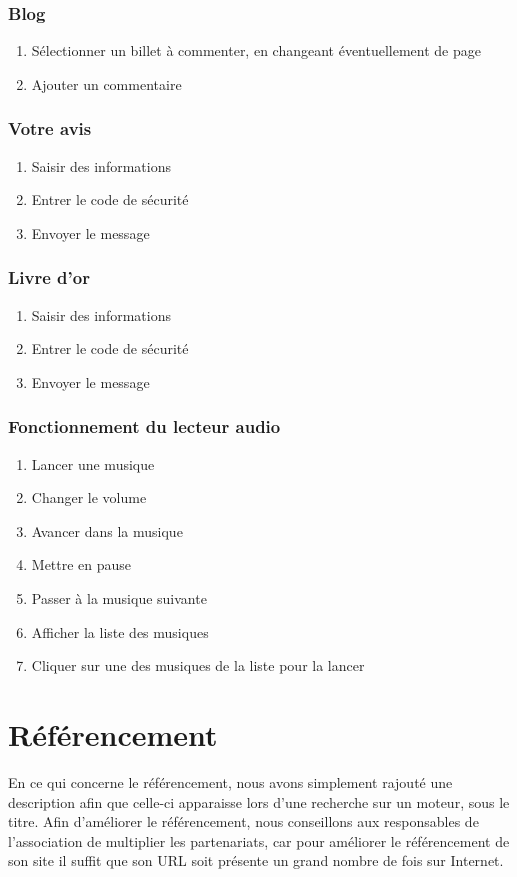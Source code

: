 \documentclass[11pt]{report}
\begin{document}
\subsubsection*{Blog}
\begin{enumerate}
\item Sélectionner un billet à commenter, en changeant éventuellement de page
\item Ajouter un commentaire
\end{enumerate}
\subsubsection*{Votre avis}
\begin{enumerate}
\item Saisir des informations 
\item Entrer le code de sécurité
\item Envoyer le message
\end{enumerate}
\subsubsection*{Livre d’or}
\begin{enumerate}
\item Saisir des informations 
\item Entrer le code de sécurité
\item Envoyer le message
\end{enumerate}

\subsubsection*{Fonctionnement du lecteur audio}
\begin{enumerate}
 \item Lancer une musique
 \item Changer le volume
\item Avancer dans la musique
\item Mettre en pause
\item Passer à la musique suivante
\item Afficher la liste des musiques
\item Cliquer sur une des musiques de la liste pour la lancer
 
\end{enumerate}

\section{Référencement}
En ce qui concerne le référencement, nous avons simplement rajouté une
description afin que celle-ci apparaisse lors d'une recherche sur un moteur,
sous le titre. Afin d'améliorer le référencement, nous conseillons aux
responsables de l’association de multiplier les partenariats, car pour améliorer
le référencement de son site il suffit que son URL soit présente un grand nombre
de fois sur Internet.
\end{document}
